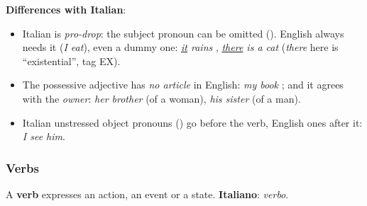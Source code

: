 \textbf{Differences with Italian}:
\begin{itemize}[nosep]
  \item Italian is \emph{pro-drop}: the subject pronoun can be omitted ().
        English always needs it (\emph{I eat}), even a dummy one: \emph{\underline{it}
        rains} , \emph{\underline{there} is a cat} 
        (\emph{there} here is ``existential'', tag EX).
  \item The possessive adjective has \emph{no article} in English: \emph{my book}
        ; and it agrees with the \emph{owner}: \emph{her brother}
         (of a woman), \emph{his sister}  (of a man).
  \item Italian unstressed object pronouns ()
        go before the verb, English ones after it:  \emph{I see him}.
\end{itemize}

\subsubsection{Verbs}
\notinslides

A \textbf{verb} expresses an action, an event or a state. \quad
\textbf{Italiano}: \emph{verbo}.

